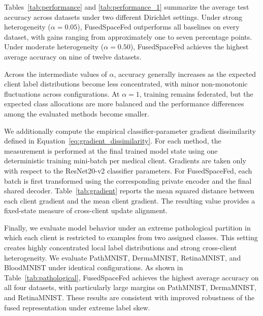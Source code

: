 \documentclass[twoside]{article}
\theoremstyle{thmstyleone}%
\theoremstyle{thmstyletwo}%
\theoremstyle{thmstylethree}%
\begin{document}
Tables~\ref{tab:performance} and \ref{tab:performance_1} summarize the average test accuracy across datasets under two different Dirichlet settings. Under strong heterogeneity ($\alpha=0.05$), FusedSpaceFed outperforms all baselines on every dataset, with gains ranging from approximately one to seven percentage points. Under moderate heterogeneity ($\alpha=0.50$), FusedSpaceFed achieves the highest average accuracy on nine of twelve datasets. %

Across the intermediate values of $\alpha$, accuracy generally increases as the expected client label distributions become less concentrated, with minor non-monotonic fluctuations across configurations. At $\alpha=1$, training
remains federated, but the expected class allocations are more balanced and the performance differences among the evaluated methods become smaller.

We additionally compute the empirical classifier-parameter gradient
dissimilarity defined in Equation~\eqref{eq:gradient_dissimilarity}. For each
method, the measurement is performed at the final trained model state using one
deterministic training mini-batch per medical client. Gradients are taken only
with respect to the ResNet20-v2 classifier parameters. For FusedSpaceFed, each
batch is first transformed using the corresponding private encoder and the
final shared decoder. Table~\ref{tab:gradient} reports the mean squared distance
between each client gradient and the mean client gradient. The resulting value provides a fixed-state measure of cross-client update alignment.

Finally, we evaluate model behavior under an extreme pathological partition in
which each client is restricted to examples from two assigned classes. This
setting creates highly concentrated local label distributions and strong
cross-client heterogeneity. We evaluate PathMNIST, DermaMNIST, RetinaMNIST, and
BloodMNIST under identical configurations. As shown in
Table~\ref{tab:pathological}, FusedSpaceFed achieves the highest average
accuracy on all four datasets, with particularly large margins on PathMNIST,
DermaMNIST, and RetinaMNIST. These results are consistent with improved
robustness of the fused representation under extreme label skew.
\end{document}

